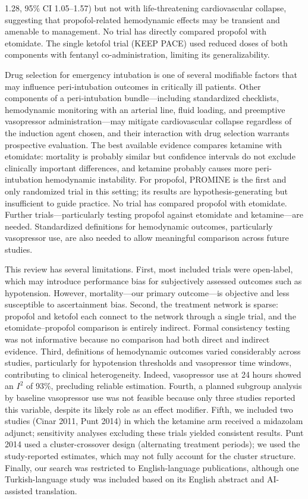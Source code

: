 \documentclass[11pt]{article}
\begin{document}
1.28, 95\% CI 1.05--1.57) but not with life-threatening cardiovascular collapse, suggesting that propofol-related hemodynamic effects may be transient and amenable to management.\cite{russotto2022} No trial has directly compared propofol with etomidate. The single ketofol trial (KEEP PACE\cite{smischney2019}) used reduced doses of both components with fentanyl co-administration, limiting its generalizability.

Drug selection for emergency intubation is one of several modifiable factors that may influence peri-intubation outcomes in critically ill patients. Other components of a peri-intubation bundle---including standardized checklists, hemodynamic monitoring with an arterial line, fluid loading, and preemptive vasopressor administration---may mitigate cardiovascular collapse regardless of the induction agent chosen, and their interaction with drug selection warrants prospective evaluation. The best available evidence compares ketamine with etomidate: mortality is probably similar but confidence intervals do not exclude clinically important differences, and ketamine probably causes more peri-intubation hemodynamic instability. For propofol, PROMINE is the first and only randomized trial in this setting; its results are hypothesis-generating but insufficient to guide practice. No trial has compared propofol with etomidate. Further trials---particularly testing propofol against etomidate and ketamine---are needed. Standardized definitions for hemodynamic outcomes, particularly vasopressor use, are also needed to allow meaningful comparison across future studies.

This review has several limitations. First, most included trials were open-label, which may introduce performance bias for subjectively assessed outcomes such as hypotension. However, mortality---our primary outcome---is objective and less susceptible to ascertainment bias. Second, the treatment network is sparse: propofol and ketofol each connect to the network through a single trial, and the etomidate--propofol comparison is entirely indirect. Formal consistency testing was not informative because no comparison had both direct and indirect evidence. Third, definitions of hemodynamic outcomes varied considerably across studies, particularly for hypotension thresholds and vasopressor time windows, contributing to clinical heterogeneity. Indeed, vasopressor use at 24 hours showed an $I^2$ of 93\%, precluding reliable estimation. Fourth, a planned subgroup analysis by baseline vasopressor use was not feasible because only three studies reported this variable, despite its likely role as an effect modifier. Fifth, we included two studies (Cinar 2011,\cite{cinar2011} Punt 2014\cite{punt2014}) in which the ketamine arm received a midazolam adjunct; sensitivity analyses excluding these trials yielded consistent results. Punt 2014 used a cluster-crossover design (alternating treatment periods); we used the study-reported estimates, which may not fully account for the cluster structure. Finally, our search was restricted to English-language publications, although one Turkish-language study was included based on its English abstract and AI-assisted translation.
\end{document}
